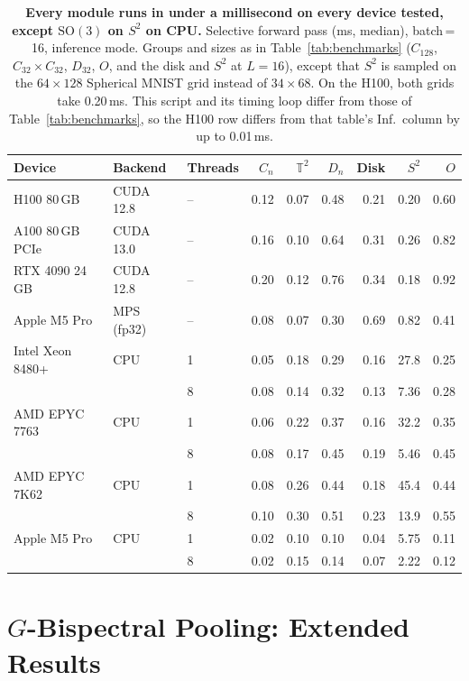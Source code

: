\documentclass{article}
\theoremstyle{definition}
\theoremstyle{remark}
\newcommand{\SO}{\mathrm{SO}}
\theoremstyle{definition}
\begin{document}
\begin{table}[h]
  \centering
  \caption{\textbf{Every module runs in under a millisecond on every device tested, except
    $\SO(3)$ on $S^2$ on CPU.} Selective forward pass (ms, median), batch\,=\,16,
    inference mode. Groups and sizes as in Table~\ref{tab:benchmarks} ($C_{128}$,
    $C_{32}{\times}C_{32}$, $D_{32}$, $O$, and the disk and $S^2$ at $L{=}16$), except that $S^2$ is
    sampled on the $64{\times}128$ Spherical MNIST grid instead of $34{\times}68$. On the
    H100, both grids take 0.20\,ms. This script and its timing loop differ from those of
    Table~\ref{tab:benchmarks}, so the H100 row differs from that table's Inf.\ column by up
    to 0.01\,ms.}
  \label{tab:portability}
  \small
  \setlength{\tabcolsep}{4pt}
  \begin{tabular*}{\linewidth}{@{\extracolsep{\fill}}lllrrrrrr@{}}
    \toprule
    Device & Backend & Threads & $C_n$ & $\mathbb{T}^2$ & $D_n$ & Disk & $S^2$ & $O$ \\
    \midrule
    H100 80\,GB & CUDA 12.8 & -- & 0.12 & 0.07 & 0.48 & 0.21 & 0.20 & 0.60 \\
    A100 80\,GB PCIe & CUDA 13.0 & -- & 0.16 & 0.10 & 0.64 & 0.31 & 0.26 & 0.82 \\
    RTX 4090 24\,GB & CUDA 12.8 & -- & 0.20 & 0.12 & 0.76 & 0.34 & 0.18 & 0.92 \\
    Apple M5 Pro & MPS (fp32) & -- & 0.08 & 0.07 & 0.30 & 0.69 & 0.82 & 0.41 \\
    \midrule
    Intel Xeon 8480+ & CPU & 1 & 0.05 & 0.18 & 0.29 & 0.16 & 27.8 & 0.25 \\
     & & 8 & 0.08 & 0.14 & 0.32 & 0.13 & 7.36 & 0.28 \\
    AMD EPYC 7763 & CPU & 1 & 0.06 & 0.22 & 0.37 & 0.16 & 32.2 & 0.35 \\
     & & 8 & 0.08 & 0.17 & 0.45 & 0.19 & 5.46 & 0.45 \\
    AMD EPYC 7K62 & CPU & 1 & 0.08 & 0.26 & 0.44 & 0.18 & 45.4 & 0.44 \\
     & & 8 & 0.10 & 0.30 & 0.51 & 0.23 & 13.9 & 0.55 \\
    Apple M5 Pro & CPU & 1 & 0.02 & 0.10 & 0.10 & 0.04 & 5.75 & 0.11 \\
     & & 8 & 0.02 & 0.15 & 0.14 & 0.07 & 2.22 & 0.12 \\
    \bottomrule
  \end{tabular*}
\end{table}

\section{$G$-Bispectral Pooling: Extended Results}
\label{app:pooling}
\end{document}
